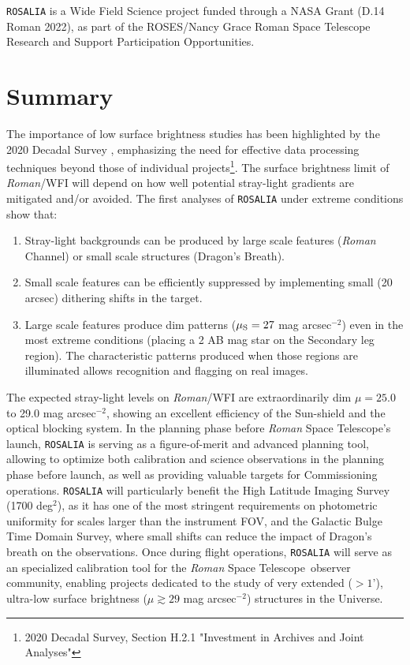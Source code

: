 \documentclass{iau}
\newcommand{\magarc}{mag arcsec\ensuremath{^{\mathrm{-2}}}}
\newcommand{\RST}{\emph{Roman} Space Telescope}
\begin{document}
\texttt{ROSALIA} is a Wide Field Science project funded through a NASA Grant (D.14 Roman 2022), as part of the ROSES/Nancy Grace Roman Space Telescope Research and Support Participation Opportunities.



\section{Summary}
\label{Sec:Summary}

The importance of low surface brightness studies has been highlighted by the 2020 Decadal Survey \citep{NAP26141}, emphasizing the need for effective data processing techniques beyond those of individual projects\footnote{2020 Decadal Survey, Section H.2.1 "Investment in Archives and Joint Analyses"}. The surface brightness limit of \emph{Roman}/WFI will depend on how well potential stray-light gradients are mitigated and/or avoided. The first analyses of \texttt{ROSALIA} under extreme conditions show that:

\begin{enumerate}
    \item Stray-light backgrounds can be produced by large scale features (\emph{Roman} Channel) or small scale structures (Dragon's Breath). 

    \item Small scale features can be efficiently suppressed by implementing small (20 arcsec) dithering shifts in the target.

    \item Large scale features produce dim patterns ($\mu_{\rm{S}}=27$ \magarc) even in the most extreme conditions (placing a 2 AB mag star on the Secondary leg region). The characteristic patterns produced when those regions are illuminated allows recognition and flagging on real images. 
\end{enumerate}

The expected stray-light levels on \emph{Roman}/WFI are extraordinarily dim $\mu = 25.0$ to 29.0 \magarc, showing an excellent efficiency of the Sun-shield and the optical blocking system. In the planning phase before \RST's launch, \texttt{ROSALIA} is serving as a figure-of-merit and advanced planning tool, allowing to optimize both calibration and science observations in the planning phase before launch, as well as providing valuable targets for Commissioning operations. \texttt{ROSALIA} will particularly benefit the High Latitude Imaging Survey (1700 deg$^2$), as it has one of the most stringent requirements on photometric uniformity for scales larger than the instrument FOV, and the Galactic Bulge Time Domain Survey, where small shifts can reduce the impact of Dragon's breath on the observations. Once during flight operations, \texttt{ROSALIA} will serve as an specialized calibration tool for the \RST\ observer community, enabling projects dedicated to the study of very extended ($>1$'), ultra-low surface brightness ($\mu\gtrsim29$ \magarc) structures in the Universe. 


{}
\end{document}
